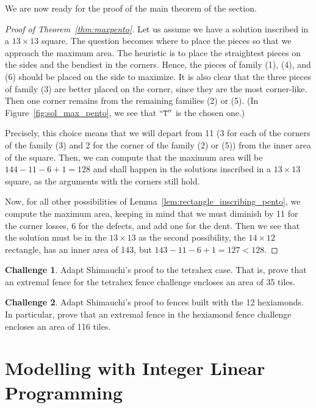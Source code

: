 \documentclass{amsart}
\theoremstyle{definition}
\newtheorem{challenge}{Challenge}
\theoremstyle{remark}
\newcommand{\polfont}[1]{\texttt{#1}}
\begin{document}
We are now ready for the proof of the main theorem of the section.
	\begin{proof}[Proof of Theorem~\ref{thm:maxpento}]
		Let us assume we have a solution inscribed in a $13\times 13$ square. The question becomes where to place the pieces so that we approach the maximum area. The heuristic is to place the straightest pieces on the sides and the bendiest in the corners.  Hence, the pieces of family (1), (4), and (6) should be placed on the side to maximize. It is also clear that the three pieces of family (3) are better placed on the corner, since they are the most corner-like. Then one corner remains from the remaining families (2) or (5). (In Figure~\ref{fig:sol_max_pento}, we see that $``\polfont{T}''$ is the chosen one.)
	
		
		Precisely, this choice means that we will depart from 11 (3 for each of the corners of the family (3) and 2 for the corner of the family (2) or (5)) from the inner area of the square. Then, we can compute that the maximum area will be $144-11-6+1 = 128$ and shall happen in the solutions inscribed in a $13\times 13$ square, as the arguments with the corners still hold. 
		
		Now, for all other possibilities of Lemma~\ref{lem:rectangle_inscribing_pento}, we compute the maximum area, keeping in mind that we must diminish by 11 for the corner losses, 6 for the defects, and add one for the dent. Then we see that the solution must be in the $13\times 13$ as the second possibility, the $14\times 12$ rectangle, has an inner area of 143, but $143-11-6+1 = 127<128$.
	\end{proof}
	
	
	\begin{challenge}\label{challenge:proof_tetrahexes}
		Adapt Shimauchi's proof to the tetrahex case. That is, prove that an extremal fence for the tetrahex fence challenge encloses an area of 35 tiles.
	\end{challenge}
	
	\begin{challenge}\label{challenge:proof_hexiamonds}
		Adapt Shimauchi's proof to fences built with the 12 hexiamonds. In particular, prove that an extremal fence in the hexiamond fence challenge encloses an area of 116 tiles.
	\end{challenge}
	
	
	
	\section{Modelling with Integer Linear Programming}\label{sec:ilp}
	
\end{document}
